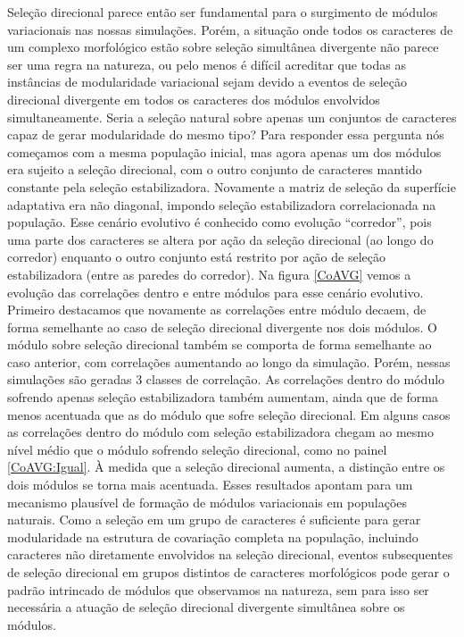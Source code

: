 Seleção direcional parece então ser fundamental para o surgimento de
módulos variacionais nas nossas simulações. 
Porém, a situação onde todos os caracteres de um complexo morfológico estão
sobre seleção simultânea divergente não parece ser uma regra na
natureza, ou pelo menos é difícil acreditar que todas as instâncias de
modularidade variacional sejam devido a eventos de seleção direcional
divergente em todos os caracteres dos módulos envolvidos simultaneamente. 
Seria a seleção natural sobre apenas um conjuntos de caracteres capaz de
gerar modularidade do mesmo tipo?
Para responder essa pergunta nós começamos com a mesma população
inicial, mas agora apenas um dos módulos era sujeito a seleção
direcional, com o outro conjunto de caracteres mantido constante pela
seleção estabilizadora. 
Novamente a matriz de seleção da superfície adaptativa era não diagonal,
impondo seleção estabilizadora correlacionada na população.
Esse cenário evolutivo é conhecido como evolução ``corredor'', pois uma
parte dos caracteres se altera por ação da seleção direcional (ao
longo do corredor) enquanto o outro conjunto está restrito por ação de
seleção estabilizadora (entre as paredes do corredor). 
Na figura \ref{CoAVG} vemos a evolução das correlações dentro e entre
módulos para esse cenário evolutivo. 
Primeiro destacamos que novamente as correlações entre módulo decaem, de
forma semelhante ao caso de seleção direcional divergente nos dois
módulos. 
O módulo sobre seleção direcional também se comporta de forma semelhante
ao caso anterior, com correlações aumentando ao longo da simulação. 
Porém, nessas simulações são geradas 3 classes de correlação. 
As correlações dentro do módulo sofrendo apenas seleção estabilizadora
também aumentam, ainda que de forma menos acentuada que as do módulo que
sofre seleção direcional. 
Em alguns casos as correlações dentro do módulo com seleção
estabilizadora chegam ao mesmo nível médio que o módulo sofrendo seleção
direcional, como no painel \ref{CoAVG:Igual}. 
À medida que a seleção direcional aumenta, a distinção entre os dois
módulos se torna mais acentuada. 
Esses resultados apontam para um mecanismo plausível de formação de
módulos variacionais em populações naturais. 
Como a seleção em um grupo de caracteres é suficiente para gerar
modularidade na estrutura de covariação completa na população, incluindo
caracteres não diretamente envolvidos na seleção direcional, eventos
subsequentes de seleção direcional em grupos distintos de caracteres
morfológicos pode gerar o padrão intrincado de módulos que observamos na
natureza, sem para isso ser necessária a atuação de seleção direcional
divergente simultânea sobre os módulos. 


